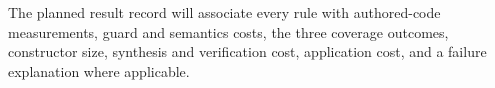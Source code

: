 The planned result record will associate every rule with authored-code
measurements, guard and semantics costs, the three coverage outcomes,
constructor size, synthesis and verification cost, application cost, and a
failure explanation where applicable. 
